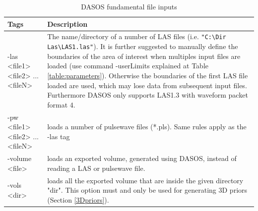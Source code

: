 \documentclass{article}
\begin{document}
		
	\begin{table}[!htbp]
	{
		\centering
		\begin{tabular}{|p{3.4cm}|p{10.7cm}|}
			\toprule
			\textbf{Tags}  & \textbf{Description}  \\
			\midrule
			-las <file1> <file2> ... <fileN> & The name/directory of a number of LAS files (i.e. \verb|"C:\Dir Las\LAS1.las"|). It is further suggested to manually define the boundaries of the area of interest when multiples input files are loaded (use command -userLimits explained at Table \ref{table:parameters}). Otherwise the boundaries of the first LAS file loaded are used, which may lose data from subsequent input files. Furthermore DASOS only supports LAS1.3 with waveform packet format 4.    \\
				\cmidrule(r){1-1}\cmidrule(l){2-2}
			-pw <file1> <file2> ... <fileN> &  loads a number of pulsewave files (*.pls). Same rules apply as the -las tag  \\
				\cmidrule(r){1-1}\cmidrule(l){2-2}
			-volume <file> &   loads an exported volume, generated using DASOS, instead of reading a LAS or pulsewave file. \\
				\cmidrule(r){1-1}\cmidrule(l){2-2}
			-vols <dir> &   loads all the exported volume that are inside the given directory "dir". This option must and only be used for generating 3D priors (Section \ref{3Dpriors}). \\
		    \bottomrule
		\end{tabular}
		\caption{DASOS fundamental file inputs}
	   	\label{table:DASOS_inputs}
	}
	\end{table}
	
\end{document}

